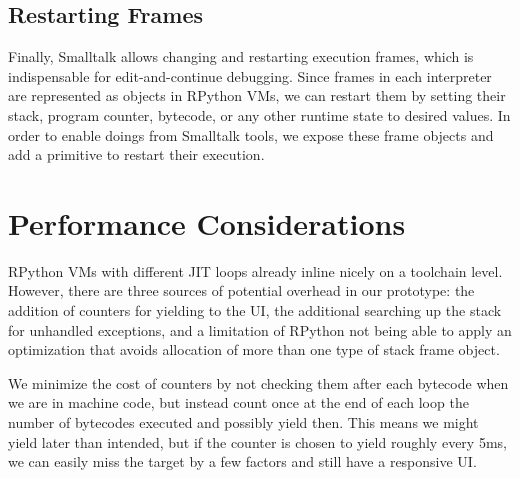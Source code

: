 \documentclass[10pt,numbers]{sigplanconf}
\begin{document}
\subsection{Restarting Frames}

Finally, Smalltalk allows changing and restarting execution frames, which is
indispensable for edit-and-continue debugging. Since frames in each interpreter
are represented as objects in RPython VMs, we can restart them by setting their
stack, program counter, bytecode, or any other runtime state to desired
values. In order to enable doings from Smalltalk tools, we expose these frame
objects and add a primitive to restart their execution.




\section{Performance Considerations}

RPython VMs with different JIT loops already inline nicely on a toolchain
level. However, there are three sources of potential overhead in our prototype:
the addition of counters for yielding to the UI, the additional searching up the
stack for unhandled exceptions, and a limitation of RPython not being able to
apply an optimization that avoids allocation of more than one type of stack
frame object.

We minimize the cost of counters by not checking them after each bytecode when
we are in machine code, but instead count once at the end of each loop the
number of bytecodes executed and possibly yield then. This means we might yield
later than intended, but if the counter is chosen to yield roughly every 5ms, we
can easily miss the target by a few factors and still have a responsive UI.
\end{document}
